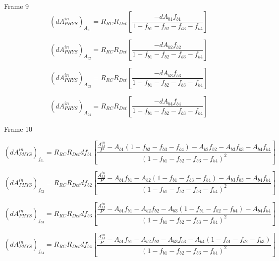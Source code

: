 \documentclass[xcolor=x11names,compress,8pt]{beamer}
\renewcommand{\(}{\begin{columns}}
\renewcommand{\)}{\end{columns}}
\newcommand{\<}[1]{\begin{column}{#1}}
\renewcommand{\>}{\end{column}}
\begin{document}
\begin{frame}{Frame 9}
\begin{equation} \label{equ:eqdPhysicsAsymmetryAb1}
(dA^{in}_{PHYS})_{A_{b1}} = R_{RC}R_{Det} \left[ \frac{ -dA_{b1}f_{b1} }{1 - f_{b1} - f_{b2} - f_{b3} - f_{b4}} \right] 
\end{equation}

\begin{equation} \label{equ:eqdPhysicsAsymmetryAb2}
(dA^{in}_{PHYS})_{A_{b2}} = R_{RC}R_{Det} \left[ \frac{ -dA_{b2}f_{b2} }{1 - f_{b1} - f_{b2} - f_{b3} - f_{b4}} \right] 
\end{equation}

\begin{equation} \label{equ:eqdPhysicsAsymmetryAb3}
(dA^{in}_{PHYS})_{A_{b3}} = R_{RC}R_{Det} \left[ \frac{ -dA_{b3}f_{b3} }{1 - f_{b1} - f_{b2} - f_{b3} - f_{b4}} \right] 
\end{equation}

\begin{equation} \label{equ:eqdPhysicsAsymmetryAb4}
(dA^{in}_{PHYS})_{A_{b4}} = R_{RC}R_{Det} \left[ \frac{ -dA_{b4}f_{b4} }{1 - f_{b1} - f_{b2} - f_{b3} - f_{b4}} \right] 
\end{equation}

\end{frame}

\begin{frame}{Frame 10}

\begin{equation} \label{equ:eqdPhysicsAsymmetryfb1}
(dA^{in}_{PHYS})_{f_{b1}} = R_{RC}R_{Det} df_{b1} \left[ \frac{ \frac{A^{in}_{M}}{P} - A_{b1}(1 - f_{b2} - f_{b3} - f_{b4}) - A_{b2}f_{b2} - A_{b3}f_{b3} - A_{b4}f_{b4} }{ (1 - f_{b1} - f_{b2} - f_{b3} - f_{b4})^{2} } \right] 
\end{equation}

\begin{equation} \label{equ:eqdPhysicsAsymmetryfb2}
(dA^{in}_{PHYS})_{f_{b2}} = R_{RC}R_{Det} df_{b2} \left[ \frac{ \frac{A^{in}_{M}}{P} - A_{b1}f_{b1} - A_{b2}(1 - f_{b1} - f_{b3} - f_{b4}) - A_{b3}f_{b3} - A_{b4}f_{b4} }{ (1 - f_{b1} - f_{b2} - f_{b3} - f_{b4})^{2} } \right] 
\end{equation}

\begin{equation} \label{equ:eqdPhysicsAsymmetryfb3}
(dA^{in}_{PHYS})_{f_{b3}} = R_{RC}R_{Det} df_{b3} \left[ \frac{ \frac{A^{in}_{M}}{P} - A_{b1}f_{b1} - A_{b2}f_{b2} - A_{b3}(1 - f_{b1} - f_{b2} - f_{b4}) - A_{b4}f_{b4} }{ (1 - f_{b1} - f_{b2} - f_{b3} - f_{b4})^{2} } \right] 
\end{equation}

\begin{equation} \label{equ:eqdPhysicsAsymmetryfb4}
(dA^{in}_{PHYS})_{f_{b4}} = R_{RC}R_{Det} df_{b4} \left[ \frac{ \frac{A^{in}_{M}}{P} - A_{b1}f_{b1} - A_{b2}f_{b2} - A_{b3}f_{b3} - A_{b4}(1 - f_{b1} - f_{b2} - f_{b3}) }{ (1 - f_{b1} - f_{b2} - f_{b3} - f_{b4})^{2} } \right] 
\end{equation}

\end{frame}
\end{document}
